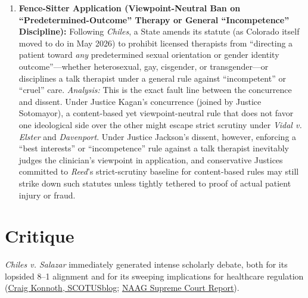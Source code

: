 \documentclass[12pt]{article}
\begin{document}
\begin{enumerate}
  \item \textbf{Fence-Sitter Application (Viewpoint-Neutral Ban on ``Predetermined-Outcome'' Therapy or General ``Incompetence'' Discipline):} Following \textit{Chiles}, a State amends its statute (as Colorado itself moved to do in May 2026) to prohibit licensed therapists from ``directing a patient toward \textit{any} predetermined sexual orientation or gender identity outcome''---whether heterosexual, gay, cisgender, or transgender---or disciplines a talk therapist under a general rule against ``incompetent'' or ``cruel'' care. \textit{Analysis:} This is the exact fault line between the concurrence and dissent. Under Justice Kagan's concurrence (joined by Justice Sotomayor), a content-based yet viewpoint-neutral rule that does not favor one ideological side over the other might escape strict scrutiny under \textit{Vidal v. Elster} and \textit{Davenport}. Under Justice Jackson's dissent, however, enforcing a ``best interests'' or ``incompetence'' rule against a talk therapist inevitably judges the clinician's viewpoint in application, and conservative Justices committed to \textit{Reed}'s strict-scrutiny baseline for content-based rules may still strike down such statutes unless tightly tethered to proof of actual patient injury or fraud.
\end{enumerate}

\section{Critique}

\textit{Chiles v. Salazar} immediately generated intense scholarly debate, both for its lopsided 8--1 alignment and for its sweeping implications for healthcare regulation (\href{https://www.scotusblog.com/2026/04/the-non-partisan-puzzle-in-the-conversion-therapy-case/}{Craig Konnoth, SCOTUSblog}; \href{https://www.naag.org/attorney-general-journal/supreme-court-report-volume-33-issue-10/}{NAAG Supreme Court Report}).
\end{document}
